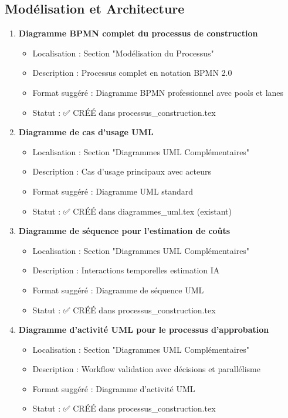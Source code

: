 \subsection{Modélisation et Architecture}

\begin{enumerate}
    \item \textbf{Diagramme BPMN complet du processus de construction}
    \begin{itemize}
        \item Localisation : Section "Modélisation du Processus"
        \item Description : Processus complet en notation BPMN 2.0
        \item Format suggéré : Diagramme BPMN professionnel avec pools et lanes
        \item Statut : ✅ CRÉÉ dans processus\_construction.tex
    \end{itemize}
    
    \item \textbf{Diagramme de cas d'usage UML}
    \begin{itemize}
        \item Localisation : Section "Diagrammes UML Complémentaires"
        \item Description : Cas d'usage principaux avec acteurs
        \item Format suggéré : Diagramme UML standard
        \item Statut : ✅ CRÉÉ dans diagrammes\_uml.tex (existant)
    \end{itemize}
    
    \item \textbf{Diagramme de séquence pour l'estimation de coûts}
    \begin{itemize}
        \item Localisation : Section "Diagrammes UML Complémentaires"
        \item Description : Interactions temporelles estimation IA
        \item Format suggéré : Diagramme de séquence UML
        \item Statut : ✅ CRÉÉ dans processus\_construction.tex
    \end{itemize}
    
    \item \textbf{Diagramme d'activité UML pour le processus d'approbation}
    \begin{itemize}
        \item Localisation : Section "Diagrammes UML Complémentaires"
        \item Description : Workflow validation avec décisions et parallélisme
        \item Format suggéré : Diagramme d'activité UML
        \item Statut : ✅ CRÉÉ dans processus\_construction.tex
    \end{itemize}
\end{enumerate}

